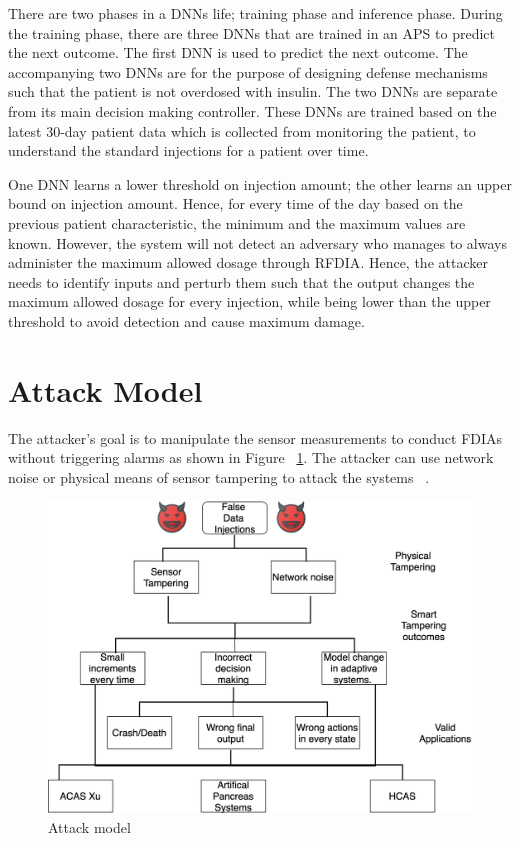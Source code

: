 There are two phases in a \ac{DNN}s life; training phase and inference phase. 
During the training phase, there are three \ac{DNN}s that are trained in an \ac{APS} to predict the next outcome. 
The first \ac{DNN} is used to predict the next outcome. 
The accompanying two \ac{DNN}s are for the purpose of designing defense mechanisms such that the patient is not overdosed with insulin.  
The two \ac{DNN}s are separate from its main decision making controller. 
These \ac{DNN}s are trained based on the latest 30-day patient data which is collected from monitoring the patient, to understand the standard injections for a patient over time. 

One \ac{DNN} learns a lower threshold on injection amount; the other learns an upper bound on injection amount. 
Hence, for every time of the day based on the previous patient characteristic, the minimum and the maximum values are known. 
However, the system will not detect  an adversary  who manages to always administer the maximum allowed dosage through \ac{RFDIA}. 
Hence, the attacker needs to identify inputs and  perturb them  such that the output changes the maximum allowed dosage for every injection,
  while being lower than the upper threshold to avoid detection and cause maximum damage. 


\section{Attack Model}
The attacker's goal is to manipulate the sensor measurements to conduct FDIAs without triggering alarms as shown in Figure ~\ref{fig:attackmodelphysical}. 
The attacker can use network noise or physical means of sensor tampering to attack the systems ~\cite{10.1145/3319535.3339815}.
 
\begin{figure}
	\centering
	\includegraphics[width=0.7\linewidth]{Images/Attackmodelphysical}
	\caption{Attack model}
	\label{fig:attackmodelphysical}
\end{figure}

